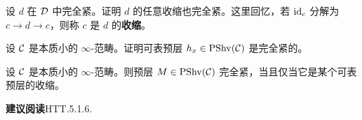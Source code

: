 
\begin{exercise}\label{L11-A.2}
设 $d$ 在 $\mathcal{D}$ 中完全紧。证明 $d$ 的任意收缩也完全紧。这里回忆，若 $\operatorname{id}_c$ 分解为 $c\to d\to c$，则称 $c$ 是 $d$ 的\textbf{收缩}。
\end{exercise}

\begin{exercise}\label{L11-A.3}
设 $\mathcal{C}$ 是本质小的 $\infty$-范畴。证明可表预层 $h_x\in\mathrm{PShv}(\mathcal{C})$ 是完全紧的。
\end{exercise}

\begin{theorem}[HTT.5.1.6.8]\label{L11-A.4}
设 $\mathcal{C}$ 是本质小的 $\infty$-范畴。则预层 $M\in\mathrm{PShv}(\mathcal{C})$ 完全紧，当且仅当它是某个可表预层的收缩。
\end{theorem}

\nitem\label{L11-A.5} \textbf{建议阅读}\quad HTT.5.1.6.

